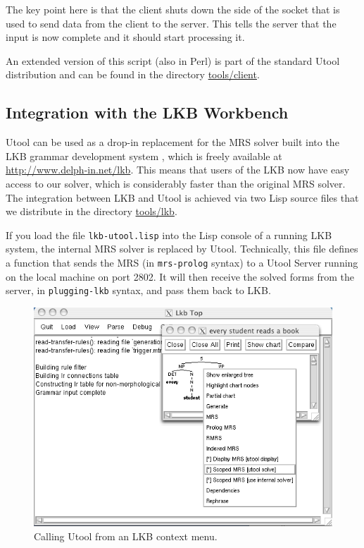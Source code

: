 The key point here is that the client shuts down the side of the
socket that is used to send data from the client to the server. This
tells the server that the input is now complete and it should start
processing it.

An extended version of this script (also in Perl) is part of the
standard Utool distribution and can be found in the directory
\url{tools/client}. 




\subsection{Integration with the LKB Workbench}
\label{sec:integration-lkb}


Utool can be used as a drop-in replacement for the MRS solver built
into the LKB grammar development system \cite{Copestake:LKB-Book},
which is freely available at \url{http://www.delph-in.net/lkb}. This means that users of the
LKB now have easy access to our solver, which is considerably faster
than the original MRS solver. The integration between LKB and Utool is
achieved via two Lisp source files that we distribute in the directory
\url{tools/lkb}.

If you load the file \verb|lkb-utool.lisp| into the Lisp console
of a running LKB system, the internal MRS solver is replaced by
Utool. Technically, this file defines a function that sends the MRS
(in \verb?mrs-prolog? syntax) to a Utool Server running on the local
machine on port 2802. It will then receive the solved forms from the
server, in \verb?plugging-lkb? syntax, and pass them back to LKB.


\begin{figure}
\begin{center}
\includegraphics[width=0.8 \textwidth]{lkb-integration}
\end{center}
\caption{Calling Utool from an LKB context menu.
\label{fig:lkb-integration}}
\end{figure}


